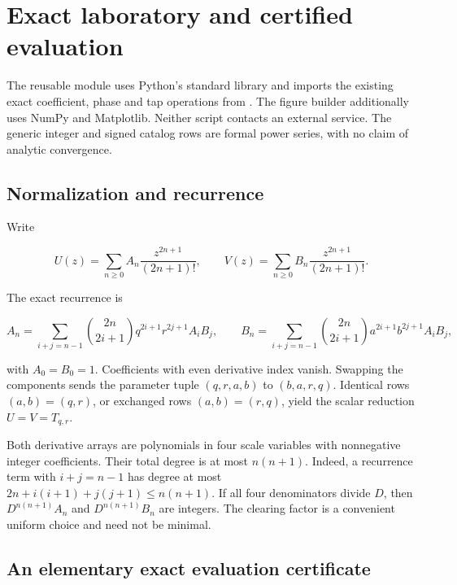 \hypertarget{v11-coupled_lab_full-exact-laboratory-and-certified-evaluation}{%
\section{Exact laboratory and certified
evaluation}\label{v11-coupled_lab_full-exact-laboratory-and-certified-evaluation}}

The reusable module  uses Python's standard
library and imports the existing exact coefficient, phase and tap
operations from . The figure builder additionally
uses NumPy and Matplotlib. Neither script contacts an external service.
The generic integer and signed catalog rows are formal power series,
with no claim of analytic convergence.

\hypertarget{v11-coupled_lab_full-normalization-and-recurrence}{%
\subsection{Normalization and
recurrence}\label{v11-coupled_lab_full-normalization-and-recurrence}}

Write

\[
U(z)=\sum_{n\ge0}A_n\frac{z^{2n+1}}{(2n+1)!},\qquad
V(z)=\sum_{n\ge0}B_n\frac{z^{2n+1}}{(2n+1)!}.
\]

The exact recurrence is

\[
A_n=\sum_{i+j=n-1}\binom{2n}{2i+1}q^{2i+1}r^{2j+1}A_iB_j,
\qquad
B_n=\sum_{i+j=n-1}\binom{2n}{2i+1}a^{2i+1}b^{2j+1}A_iB_j,
\]

with \(A_0=B_0=1\). Coefficients with even derivative index vanish.
Swapping the components sends the parameter tuple \((q,r,a,b)\) to
\((b,a,r,q)\). Identical rows \((a,b)=(q,r)\), or exchanged rows
\((a,b)=(r,q)\), yield the scalar reduction \(U=V=T_{q,r}\).

Both derivative arrays are polynomials in four scale variables with
nonnegative integer coefficients. Their total degree is at most
\(n(n+1)\). Indeed, a recurrence term with \(i+j=n-1\) has degree at
most \(2n+i(i+1)+j(j+1)\le n(n+1)\). If all four denominators divide
\(D\), then \(D^{n(n+1)}A_n\) and \(D^{n(n+1)}B_n\) are integers. The
clearing factor is a convenient uniform choice and need not be minimal.

\hypertarget{v11-coupled_lab_full-an-elementary-exact-evaluation-certificate}{%
\subsection{An elementary exact evaluation
certificate}\label{v11-coupled_lab_full-an-elementary-exact-evaluation-certificate}}

